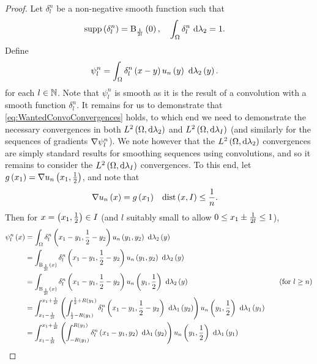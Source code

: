 \documentclass[11pt]{report}
\theoremstyle{plain}
\begin{document}
\begin{proof}
	Let $\delta_l^n$ be a non-negative smooth function such that
	\begin{align*}
		\mathrm{supp}\left( \delta_l^n \right) = \mathrm{B}_{\frac{1}{2l}}\left( 0 \right),
		&\quad \int_{\Omega}\delta_l^n \ \mathrm{d}\lambda_2 = 1.
	\end{align*}
	Define
	\begin{align*}
		\psi_l^n &= \int_{\Omega}\delta_l^n\left( x-y \right)u_n\left( y \right) \ \mathrm{d}\lambda_2\left( y \right).
	\end{align*}
	for each $l\in\mathbb{N}$. 
	Note that $\psi_l^n$ is smooth as it is the result of a convolution with a smooth function $\delta_l^n$.
	It remains for us to demonstrate that \eqref{eq:WantedConvoConvergences} holds, to which end we need to demonstrate the necessary convergences in both $L^{2}\left( \Omega,\mathrm{d}\lambda_2 \right)$ and $L^{2}\left( \Omega,\mathrm{d}\lambda_I \right)$ (and similarly for the sequences of gradients $\nabla\psi_l^n$).
	We note however that the $L^{2}\left( \Omega,\mathrm{d}\lambda_2 \right)$ convergences are simply standard results for smoothing sequences using convolutions, and so it remains to consider the $L^{2}\left( \Omega,\mathrm{d}\lambda_I \right)$ convergences.
	To this end, let $g\left( x_1 \right)=\nabla u_n\left( x_1,\frac{1}{2} \right)$, and note that
	\begin{align*}
		\nabla u_n\left( x \right) = g\left( x_1 \right) &\quad \mathrm{dist}\left( x,I \right)\leq\frac{1}{n}.
	\end{align*}
	Then for $x=\left( x_1,\frac{1}{2} \right)\in I$ (and $l$ suitably small to allow $0\leq x_1\pm\frac{1}{2l}\leq1$),
	\begin{align*}
		\psi_l^n\bracs{x} &= \integral{\ddom}{\delta_l^n\bracs{x_1-y_1,\recip{2}-y_2}u_n\bracs{y_1,y_2}}{\lambda_2\bracs{y}} \\
		&= \integral{\mathrm{B}_{\recip{2l}}\bracs{x}}{\delta_l^n\bracs{x_1-y_1,\recip{2}-y_2}u_n\bracs{y_1,y_2}}{\lambda_2\bracs{y}} \\
		&= \integral{\mathrm{B}_{\recip{2l}}\bracs{x}}{\delta_l^n\bracs{x_1-y_1,\recip{2}-y_2}u_n\bracs{y_1,\recip{2}}}{\lambda_2\bracs{y}} &\quad(\text{for } l\geq n) \\
		&= \int_{x_1-\recip{2l}}^{x_1+\recip{2l}} \bracs{\int_{\recip{2}-R\bracs{y_1}}^{\recip{2}+R\bracs{y_1}} \delta_l^n\bracs{x_1-y_1,\recip{2}-y_2} \ \md\lambda_1\bracs{y_2} } u_n\bracs{y_1,\recip{2}} \ \md \lambda_1\bracs{y_1} \\
		&= \int_{x_1-\recip{2l}}^{x_1+\recip{2l}} \bracs{\int_{-R\bracs{y_1}}^{R\bracs{y_1}} \delta_l^n\bracs{x_1-y_1,y_2} \ \md\lambda_1\bracs{y_2} } u_n\bracs{y_1,\recip{2}} \ \md \lambda_1\bracs{y_1}

\end{align*}
\end{proof}
\end{document}
